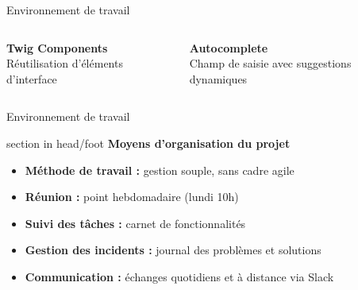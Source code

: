 \documentclass{beamer}
\begin{document}
\begin{frame}{Environnement de travail}
\begin{center}
\begin{minipage}{0.9\textwidth}
\begin{columns}[T, onlytextwidth]
      				\begin{minipage}[t][2cm][t]{\linewidth}
        					\raggedright
        					\textbf{Twig Components} \\
        					Réutilisation d'éléments d'interface
      				\end{minipage}
      				\vspace{0.7em}
          			\pause
      
      				\begin{minipage}[t][2cm][t]{\linewidth}
        					\raggedright
        					\textbf{Autocomplete} \\
        					Champ de saisie avec suggestions dynamiques
      				\end{minipage}
      
  			\end{columns}
		\end{minipage}
	\end{center}
	\vfill
\end{frame}

\begin{frame}[label=env]{Environnement de travail}
    \begin{beamercolorbox}[wd=\paperwidth,ht=1.5em,dp=0.5em,leftskip=0.5cm]{section in head/foot}
        \large \textbf{Moyens d'organisation du projet}
    \end{beamercolorbox}
    \vspace{0.5em}
    \begin{center}
\begin{minipage}{0.9\textwidth}
    \begin{itemize}
        \item<1-> \textbf{Méthode de travail :} gestion souple, sans cadre agile
        \item<2-> \textbf{Réunion :} point hebdomadaire (lundi 10h)
        \item<3-> \textbf{Suivi des tâches :} carnet de fonctionnalités
        \item<4-> \textbf{Gestion des incidents :} journal des problèmes et solutions
        \item<5-> \textbf{Communication :} échanges quotidiens et à distance via Slack
    \end{itemize}
\end{minipage}

    \end{center}
    \vfill
\end{frame}
\end{document}
